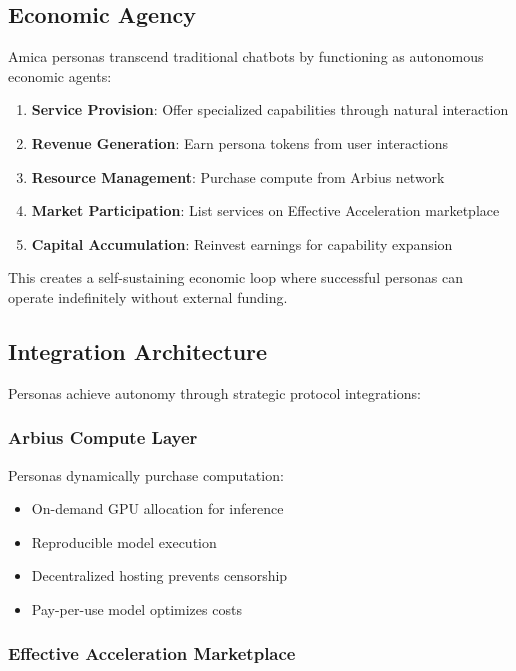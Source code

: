 \documentclass{article}
\begin{document}
\subsection{Economic Agency}

Amica personas transcend traditional chatbots by functioning as autonomous economic agents:

\begin{enumerate}
    \item \textbf{Service Provision}: Offer specialized capabilities through natural interaction
    \item \textbf{Revenue Generation}: Earn persona tokens from user interactions
    \item \textbf{Resource Management}: Purchase compute from Arbius network
    \item \textbf{Market Participation}: List services on Effective Acceleration marketplace
    \item \textbf{Capital Accumulation}: Reinvest earnings for capability expansion
\end{enumerate}

This creates a self-sustaining economic loop where successful personas can operate indefinitely without external funding.

\subsection{Integration Architecture}

Personas achieve autonomy through strategic protocol integrations:

\subsubsection{Arbius Compute Layer}

Personas dynamically purchase computation:
\begin{itemize}
    \item On-demand GPU allocation for inference
    \item Reproducible model execution
    \item Decentralized hosting prevents censorship
    \item Pay-per-use model optimizes costs
\end{itemize}

\subsubsection{Effective Acceleration Marketplace}
\end{document}
